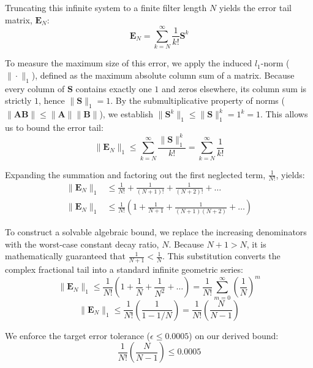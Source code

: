 \documentclass[11pt, a4paper]{article}
\begin{document}
\noindent Truncating this infinite system to a finite filter length $N$ yields the error tail matrix, $\mathbf{E}_N$:
\begin{equation}
    \mathbf{E}_N = \sum_{k=N}^{\infty} \frac{1}{k!} \mathbf{S}^k
\end{equation}

\noindent To measure the maximum size of this error, we apply the induced $l_1$-norm ($\|\cdot\|_1$), defined as the maximum absolute column sum of a matrix. Because every column of $\mathbf{S}$ contains exactly one $1$ and zeros elsewhere, its column sum is strictly $1$, hence $\|\mathbf{S}\|_1 = 1$. By the submultiplicative property of norms ($\|\mathbf{A}\mathbf{B}\| \le \|\mathbf{A}\|\|\mathbf{B}\|$), we establish $\|\mathbf{S}^k\|_1 \le \|\mathbf{S}\|_1^k = 1^k = 1$. This allows us to bound the error tail:
\begin{equation}
    \|\mathbf{E}_N\|_1 \le \sum_{k=N}^{\infty} \frac{\|\mathbf{S}\|_1^k}{k!} = \sum_{k=N}^{\infty} \frac{1}{k!}
\end{equation}

\noindent Expanding the summation and factoring out the first neglected term, $\frac{1}{N!}$, yields:
\begin{align}
    \|\mathbf{E}_N\|_1 &\le \frac{1}{N!} + \frac{1}{(N+1)!} + \frac{1}{(N+2)!} + \dots \\
    \|\mathbf{E}_N\|_1 &\le \frac{1}{N!} \left( 1 + \frac{1}{N+1} + \frac{1}{(N+1)(N+2)} + \dots \right)
\end{align}

\noindent To construct a solvable algebraic bound, we replace the increasing denominators with the worst-case constant decay ratio, $N$. Because $N+1 > N$, it is mathematically guaranteed that $\frac{1}{N+1} < \frac{1}{N}$. This substitution converts the complex fractional tail into a standard infinite geometric series:
\begin{equation}
    \|\mathbf{E}_N\|_1 \le \frac{1}{N!} \left( 1 + \frac{1}{N} + \frac{1}{N^2} + \dots \right) = \frac{1}{N!} \sum_{m=0}^{\infty} \left(\frac{1}{N}\right)^m
\end{equation}
\begin{equation}
    \|\mathbf{E}_N\|_1 \le \frac{1}{N!} \left( \frac{1}{1 - 1/N} \right) = \frac{1}{N!} \left( \frac{N}{N-1} \right)
\end{equation}

\noindent We enforce the target error tolerance ($\epsilon \le 0.0005$) on our derived bound:
\begin{equation}
    \frac{1}{N!} \left( \frac{N}{N-1} \right) \le 0.0005
\end{equation}
\end{document}
